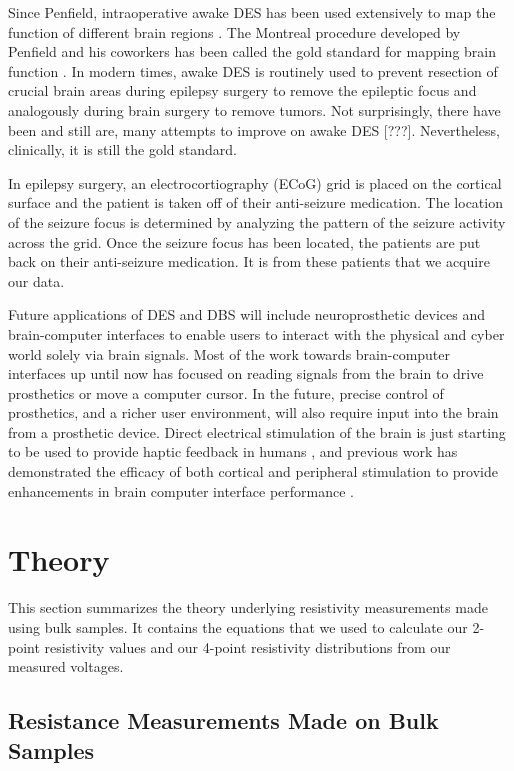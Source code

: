 Since Penfield, intraoperative awake DES has been used extensively to map the function of different brain regions \cite{Penfield1937}. The Montreal procedure developed by Penfield and his coworkers has been called the gold standard for mapping brain function \cite{Borchers2012}. In modern times, awake DES is routinely used to prevent resection of crucial brain areas during epilepsy surgery to remove the epileptic focus and analogously during brain surgery to remove tumors. Not surprisingly, there have been and still are, many attempts to improve on awake DES [???]. Nevertheless, clinically, it is still the gold standard.

In epilepsy surgery, an electrocortiography (ECoG) grid is placed on the cortical surface and the patient is taken off of their anti-seizure medication. The location of the seizure focus is determined by analyzing the pattern of the seizure activity across the grid. Once the seizure focus has been located, the patients are put back on their anti-seizure medication. It is from these patients that we acquire our data.

Future applications of DES and DBS will include neuroprosthetic devices and brain-computer interfaces to enable users to interact with the physical and cyber world solely via brain signals. Most of the work towards brain-computer interfaces up until now has focused on reading signals from the brain to drive prosthetics or move a computer cursor.  In the future, precise control of prosthetics, and a richer user environment, will also require input into the brain from a prosthetic device. Direct electrical stimulation of the brain is just starting to be used to provide haptic feedback in humans \cite{Cronin2016a,Collins2016}, and previous work has demonstrated the efficacy of both cortical and peripheral stimulation to provide enhancements in brain computer interface performance \cite{Klaes2014,Dadarlat2015}.


\section{Theory}

This section summarizes the theory underlying resistivity measurements made using bulk samples. It contains the equations that we used to calculate our 2-point resistivity values and our 4-point resistivity distributions from our measured voltages.

\subsection{Resistance Measurements Made on Bulk Samples}

